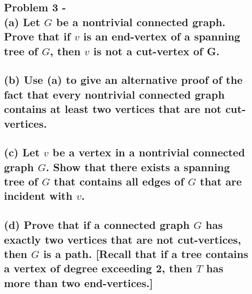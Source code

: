 \documentclass[10pt,a4paper]{article}
\begin{document}
\subsection*{\newpage Problem 3 -\\
(a) Let $G$ be a nontrivial connected graph. Prove that if $v$ is an end-vertex of a spanning tree of $G$, then $v$ is not a cut-vertex of G.\\\\
(b) Use (a) to give an alternative proof of the fact that every nontrivial connected graph contains at least two vertices that are not cut-vertices.\\\\
(c) Let $v$ be a vertex in a nontrivial connected graph $G$. Show that there exists a spanning tree of $G$ that contains all edges of $G$ that are incident with $v$.\\\\
(d) Prove that if a connected graph $G$ has exactly two vertices that are not cut-vertices, then $G$ is a path. [Recall that if a tree contains a vertex of degree exceeding 2, then $T$ has more than two end-vertices.]\\}
\end{document}
